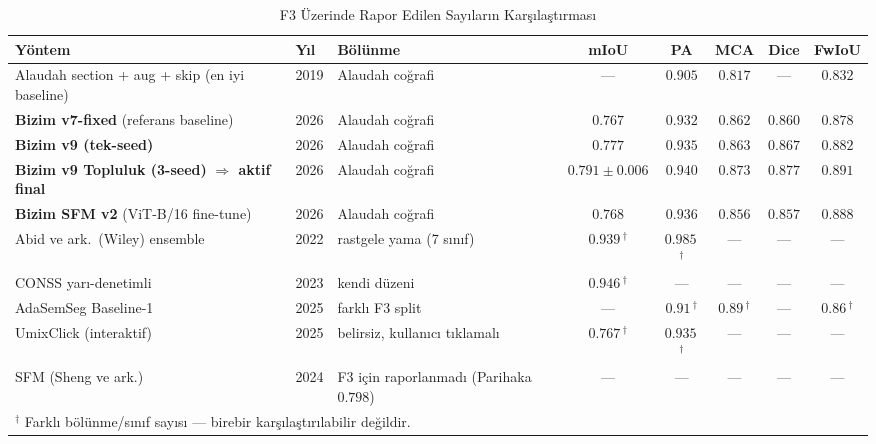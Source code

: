 \documentclass[conference,a4paper,10pt]{IEEEtran}
\begin{document}
\begin{table}[!t]
\renewcommand{\arraystretch}{1.25}
\caption{F3 Üzerinde Rapor Edilen Sayıların Karşılaştırması}
\label{tab:sota}
\centering
\begin{tabular}{p{4.0cm}lp{2.0cm}ccccc}
\toprule
\textbf{Yöntem} & \textbf{Yıl} & \textbf{Bölünme} & \textbf{mIoU} & \textbf{PA} & \textbf{MCA} & \textbf{Dice} & \textbf{FwIoU} \\
\midrule
Alaudah section + aug + skip (en iyi baseline)~\cite{alaudah2019} & 2019 & Alaudah coğrafi & --- & $0.905$ & $0.817$ & --- & $0.832$ \\
\textbf{Bizim v7-fixed} (referans baseline)  & 2026 & Alaudah coğrafi & $0.767$ & $0.932$ & $0.862$ & $0.860$ & $0.878$ \\
\textbf{Bizim v9 (tek-seed)}                 & 2026 & Alaudah coğrafi & $0.777$ & $0.935$ & $0.863$ & $0.867$ & $0.882$ \\
\rowcolor{green!20}
\textbf{Bizim v9 Topluluk (3-seed)} \textbf{$\Rightarrow$ aktif final} & 2026 & Alaudah coğrafi & $\mathbf{0.791 \pm 0.006}$ & $\mathbf{0.940}$ & $\mathbf{0.873}$ & $\mathbf{0.877}$ & $\mathbf{0.891}$ \\
\textbf{Bizim SFM v2} (ViT-B/16 fine-tune) & 2026 & Alaudah coğrafi & $0.768$ & $0.936$ & $0.856$ & $0.857$ & $0.888$ \\
\midrule
Abid ve ark.\ (Wiley) ensemble~\cite{abid2022} & 2022 & rastgele yama (7 sınıf) & $0.939$\,$^\dagger$ & $0.985$\,$^\dagger$ & --- & --- & --- \\
CONSS yarı-denetimli~\cite{conss2023}        & 2023 & kendi düzeni & $0.946$\,$^\dagger$ & --- & --- & --- & --- \\
AdaSemSeg Baseline-1~\cite{adasemseg2025}    & 2025 & farklı F3 split & --- & $0.91$\,$^\dagger$ & $0.89$\,$^\dagger$ & --- & $0.86$\,$^\dagger$ \\
UmixClick (interaktif)~\cite{umixclick2025}  & 2025 & belirsiz, kullanıcı tıklamalı & $0.767$\,$^\dagger$ & $0.935$\,$^\dagger$ & --- & --- & --- \\
SFM (Sheng ve ark.)~\cite{sfm2024}           & 2024 & F3 için raporlanmadı (Parihaka $0.798$) & --- & --- & --- & --- & --- \\
\bottomrule
\multicolumn{8}{l}{\footnotesize $^\dagger$ Farklı bölünme/sınıf sayısı --- birebir karşılaştırılabilir değildir.}
\end{tabular}
\end{table}
\end{document}
